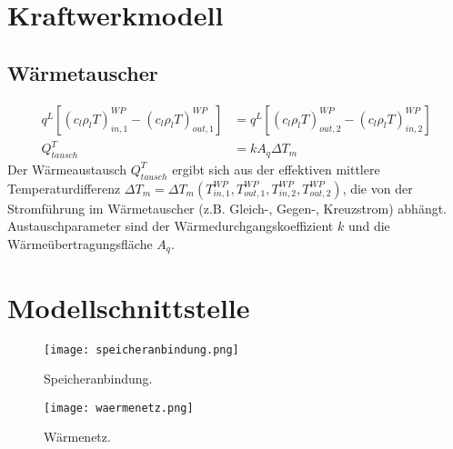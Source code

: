 \documentclass[12pt, a4paper, twoside, titlepage]{article}
\begin{document}
%
\section{Kraftwerkmodell}
%
\subsection{W\" armetauscher}
%

%
\begin{subequations}
\begin{align}
q^L \left[ (c_l \rho_l T)^{WP}_{in,1} - (c_l \rho_l T)^{WP}_{out,1} \right] &= q^L \left[ (c_l \rho_l T)^{WP}_{out,2} - (c_l \rho_l T)^{WP}_{in,2} \right] \\
Q^T_{tausch}  &=  k A_q \Delta T_m
\end{align}
\end{subequations}
%
Der W\" armeaustausch $Q^T_{tausch}$ ergibt sich aus der effektiven mittlere Temperaturdifferenz
$\Delta T_m = \Delta T_m (T^{WP}_{in,1}, T^{WP}_{out,1}, T^{WP}_{in,2}, T^{WP}_{out,2})$,
die von der Stromf\" uhrung im W\" armetauscher (z.B. Gleich-, Gegen-, Kreuzstrom) abh\" angt.
%
Austauschparameter sind der W\" armedurchgangskoeffizient $k$ und die W\" arme\" ubertragungsfl\" ache $A_q$.

\section{Modellschnittstelle}
%

\begin{figure} [b!]
\centering
\texttt{[image: speicheranbindung.png]}
\caption{Speicheranbindung.}
\label{fig:speicheranbindung}
\end{figure}


\begin{figure} [b!]
\centering
\texttt{[image: waermenetz.png]}
\caption{W\" armenetz.}
\label{fig:waermenetz}
\end{figure}
\end{document}
